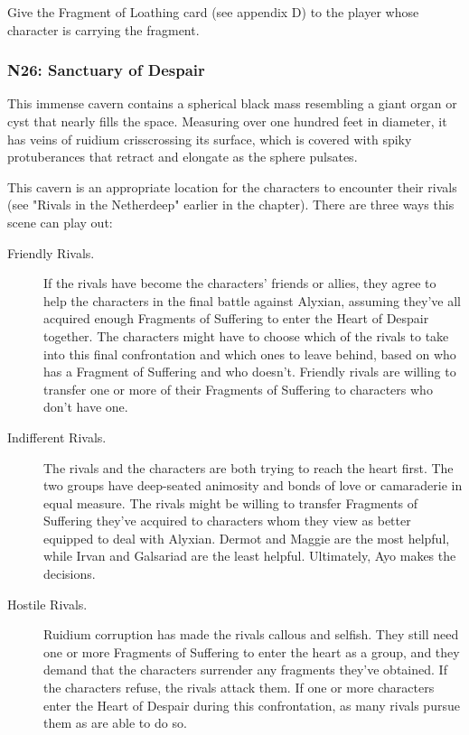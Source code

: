 \documentclass[10pt,a4paper,twoside,bg=print,twocolumn,openany,nodeprecatedcode]{dndbook}
\begin{document}
Give the Fragment of Loathing card (see appendix D) to the player whose character is carrying the fragment.

\subsubsection{N26: Sanctuary of Despair}
\begin{DndReadAloud}{}
This immense cavern contains a spherical black mass resembling a giant organ or cyst that nearly fills the space. Measuring over one hundred feet in diameter, it has veins of ruidium crisscrossing its surface, which is covered with spiky protuberances that retract and elongate as the sphere pulsates.

\end{DndReadAloud}

This cavern is an appropriate location for the characters to encounter their rivals (see "Rivals in the Netherdeep" earlier in the chapter). There are three ways this scene can play out:


\begin{description}
\item[Friendly Rivals.]
If the rivals have become the characters' friends or allies, they agree to help the characters in the final battle against Alyxian, assuming they've all acquired enough Fragments of Suffering to enter the Heart of Despair together. The characters might have to choose which of the rivals to take into this final confrontation and which ones to leave behind, based on who has a Fragment of Suffering and who doesn't. Friendly rivals are willing to transfer one or more of their Fragments of Suffering to characters who don't have one.
\item[Indifferent Rivals.]
The rivals and the characters are both trying to reach the heart first. The two groups have deep-seated animosity and bonds of love or camaraderie in equal measure. The rivals might be willing to transfer Fragments of Suffering they've acquired to characters whom they view as better equipped to deal with Alyxian. Dermot and Maggie are the most helpful, while Irvan and Galsariad are the least helpful. Ultimately, Ayo makes the decisions.
\item[Hostile Rivals.]
Ruidium corruption has made the rivals callous and selfish. They still need one or more Fragments of Suffering to enter the heart as a group, and they demand that the characters surrender any fragments they've obtained. If the characters refuse, the rivals attack them. If one or more characters enter the Heart of Despair during this confrontation, as many rivals pursue them as are able to do so.
\end{description}
\end{document}
